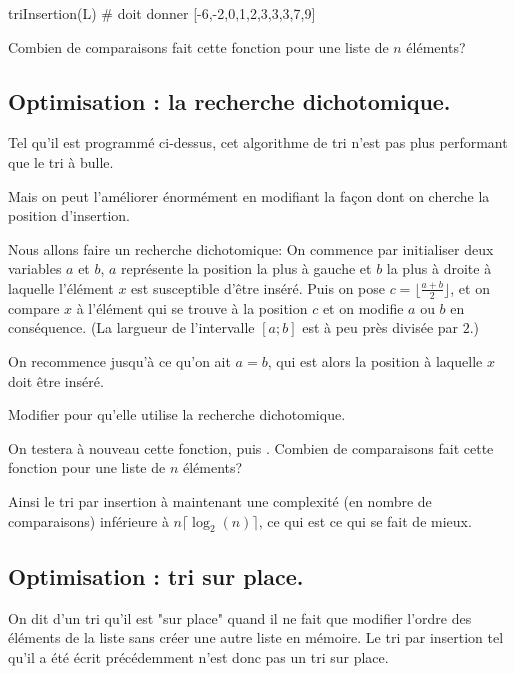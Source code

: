 \documentclass[french,12pt,twoside]{VcCours}
\begin{document}
\begin{Python}
triInsertion(L) # doit donner [-6,-2,0,1,2,3,3,3,7,9]
\end{Python}

\begin{Exercice}
Combien de comparaisons fait cette fonction pour une liste de $n$ éléments?
\end{Exercice}

\subsection{Optimisation : la recherche dichotomique.}

Tel qu'il est programmé ci-dessus, cet algorithme de tri n'est pas plus 
performant que le tri à bulle.

Mais on peut l'améliorer énormément en modifiant la façon dont on cherche la 
position d'insertion.

\medskip
Nous allons faire un recherche dichotomique:
On commence par initialiser deux variables $a$ et $b$, $a$ représente la 
position la plus à gauche et $b$ la plus à droite à laquelle l'élément $x$ est 
susceptible d'être inséré. Puis on pose $c=\lfloor\tfrac{a+b}{2}\rfloor$, et on 
compare $x$ à l'élément qui se trouve à la position $c$ et on modifie $a$ ou $b$ 
en conséquence. (La largueur de l'intervalle $[a;b]$ est à peu près divisée par 
$2$.)

On recommence jusqu'à ce qu'on ait $a=b$, qui est alors la position à laquelle 
$x$ doit être inséré.

\begin{Exercice}
Modifier  pour qu'elle utilise la recherche 
dichotomique.

On testera à nouveau cette fonction, puis .
Combien de comparaisons fait cette fonction pour une liste de $n$ éléments?
\end{Exercice}

Ainsi le tri par insertion à maintenant une complexité (en nombre de 
comparaisons) inférieure à $n\lceil\log_2(n)\rceil$, ce qui est ce qui 
se fait de mieux.

\subsection{Optimisation : tri sur place.}

On dit d'un tri qu'il est "sur place" quand il ne fait que modifier l'ordre des 
éléments de la liste sans créer une autre liste en mémoire. Le tri par insertion 
tel qu'il a été écrit précédemment n'est donc pas un tri sur place.
\end{document}
